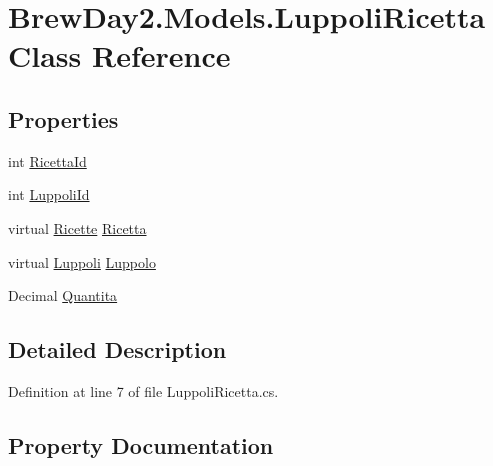 \hypertarget{class_brew_day2_1_1_models_1_1_luppoli_ricetta}{}\section{Brew\+Day2.\+Models.\+Luppoli\+Ricetta Class Reference}
\label{class_brew_day2_1_1_models_1_1_luppoli_ricetta}
\subsection*{Properties}
\begin{DoxyCompactItemize}
\item 
int \mbox{\hyperlink{class_brew_day2_1_1_models_1_1_luppoli_ricetta_ab2c1bae28627039dc836b0911211bf2e}{Ricetta\+Id}}
\item 
int \mbox{\hyperlink{class_brew_day2_1_1_models_1_1_luppoli_ricetta_a66310d65e4789c0675d5d62f1e816a17}{Luppoli\+Id}}
\item 
virtual \mbox{\hyperlink{class_brew_day2_1_1_models_1_1_ricette}{Ricette}} \mbox{\hyperlink{class_brew_day2_1_1_models_1_1_luppoli_ricetta_a81a1298021f67bc36943672a5e4f9c9f}{Ricetta}}
\item 
virtual \mbox{\hyperlink{class_brew_day2_1_1_models_1_1_luppoli}{Luppoli}} \mbox{\hyperlink{class_brew_day2_1_1_models_1_1_luppoli_ricetta_a8624239a3bcf95b22501a0a3662f4b77}{Luppolo}}
\item 
Decimal \mbox{\hyperlink{class_brew_day2_1_1_models_1_1_luppoli_ricetta_af1a4856edec44f3122a715e6eb48fd5d}{Quantita}}
\end{DoxyCompactItemize}


\subsection{Detailed Description}


Definition at line 7 of file Luppoli\+Ricetta.\+cs.



\subsection{Property Documentation}
\mbox{\label{class_brew_day2_1_1_models_1_1_luppoli_ricetta_a66310d65e4789c0675d5d62f1e816a17}} 
